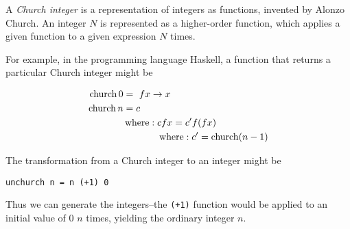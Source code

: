 \documentclass[12pt]{article}
\begin{document}
A \emph{Church integer} is a representation of integers as functions, invented by Alonzo Church.  An integer $N$ is represented as a higher-order function, which applies a given function to a given expression $N$ times.

For example, in the programming language Haskell, a function that returns a particular Church integer might be

\begin{align*}
\operatorname{church} 0 &= \ f x \rightarrow x\\
\operatorname{church} n &= c\\
&\operatorname{where}: c f x = c' f (f x)\\
&\hspace{.5in}\operatorname{where}: c' = \operatorname{church} (n - 1)\\
\end{align*}

The transformation from a Church integer to an integer might be

\begin{verbatim}
unchurch n = n (+1) 0
\end{verbatim}

Thus we can generate the integers--the \texttt{(+1)} function would be applied to an initial value of $0$ $n$ times, yielding the ordinary integer $n$.
\end{document}

